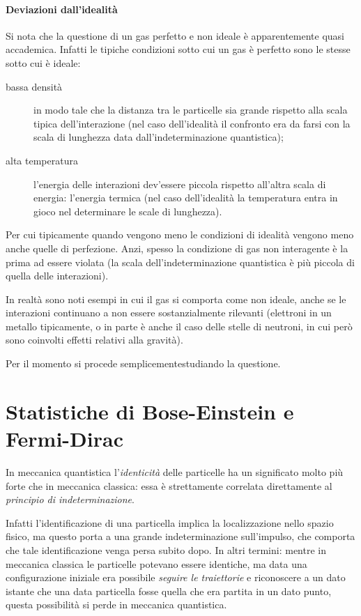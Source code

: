 \paragraph{Deviazioni dall'idealità} Si nota che la questione di un gas perfetto e non ideale è apparentemente quasi accademica. Infatti le tipiche condizioni sotto cui un gas è perfetto sono le stesse sotto cui è ideale:
\begin{description}
	\item[bassa densità] in modo tale che la distanza tra le particelle sia grande rispetto alla scala tipica dell'interazione (nel caso dell'idealità il confronto era da farsi con la scala di lunghezza data dall'indeterminazione quantistica);
	\item[alta temperatura] l'energia delle interazioni dev'essere piccola rispetto all'altra scala di energia: l'energia termica (nel caso dell'idealità la temperatura entra in gioco nel determinare le scale di lunghezza).
\end{description}

Per cui tipicamente quando vengono meno le condizioni di idealità vengono meno anche quelle di perfezione. Anzi, spesso la condizione di gas non interagente è la prima ad essere violata (la scala dell'indeterminazione quantistica è più piccola di quella delle interazioni).

In realtà sono noti esempi in cui il gas si comporta come non ideale, anche se le interazioni continuano a non essere sostanzialmente rilevanti (elettroni in un metallo tipicamente, o in parte è anche il caso delle stelle di neutroni, in cui però sono coinvolti effetti relativi alla gravità).

Per il momento si procede semplicementestudiando la questione.

\section{Statistiche di Bose-Einstein e Fermi-Dirac}
\label{sec:BFstat}

In meccanica quantistica l'\textit{identicità} delle particelle ha un significato molto più forte che in meccanica classica: essa è strettamente correlata direttamente al \textit{principio di indeterminazione}.

Infatti l'identificazione di una particella implica la localizzazione nello spazio fisico, ma questo porta a una grande indeterminazione sull'impulso, che comporta che tale identificazione venga persa subito dopo. In altri termini: mentre in meccanica classica le particelle potevano essere identiche, ma data una configurazione iniziale era possibile \textit{seguire le traiettorie} e riconoscere a un dato istante che una data particella fosse quella che era partita in un dato punto, questa possibilità si perde in meccanica quantistica.
\newline

